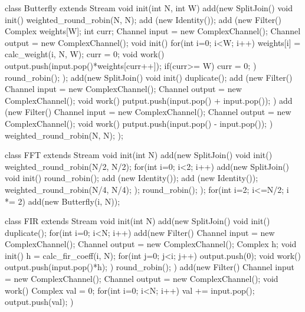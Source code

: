 

class Butterfly extends Stream {
   void init(int N, int W) {
      add(new SplitJoin() {
         void init() {
            weighted_round_robin(N, N);
            add (new Identity());
            add (new Filter() {
               Complex weights[W];
               int curr;
               Channel input = new ComplexChannel();
               Channel output = new ComplexChannel();
               void init() {
                  for(int i=0; i<W; i++)
                     weights[i] = calc_weight(i, N, W);
                  curr = 0;
               }
               void work() {
                  output.push(input.pop()*weights[curr++]);
                  if(curr>= W) curr = 0;
               }    
            })
            round_robin();
      }});
      add(new SplitJoin() {
         void init() {
            duplicate();
            add (new Filter() {   
               Channel input = new ComplexChannel();
               Channel output = new ComplexChannel();
               void work() {
                  putput.push(input.pop() + input.pop());
               }
            })
            add (new Filter() {   
               Channel input = new ComplexChannel();
               Channel output = new ComplexChannel();
               void work() {
                  putput.push(input.pop() - input.pop());
               }
            })
            weighted_round_robin(N, N);
      }});
   }
}

class FFT extends Stream {
   void init(int N) {
      add(new SplitJoin() {
         void init() {
            weighted_round_robin(N/2, N/2);
            for(int i=0; i<2; i++) 
               add(new SplitJoin() {
                  void init() {
                     round_robin();
                     add (new Identity());
                     add (new Identity());
                     weighted_round_robin(N/4, N/4);
               }});
            round_robin();
      }});
      for(int i=2; i<=N/2; i *= 2)
        add(new Butterfly(i, N));
   }
}

class FIR extends Stream {
   void init(int N) {
      add(new SplitJoin() {
         void init() {
            duplicate();
            for(int i=0; i<N; i++)
               add(new Filter() {
                  Channel input = new ComplexChannel();
                  Channel output = new ComplexChannel();           
		  Complex h;
                  void init() {
                     h = calc_fir_coeff(i, N);
                     for(int j=0; j<i; j++) 
                        output.push(0);
                  }
                  void work() {
                     output.push(input.pop()*h);
                  }
               })
            round_robin();
         }
      })
      add(new Filter() { 
         Channel input = new ComplexChannel();
         Channel output = new ComplexChannel();
         void work() {
	    Complex val = 0;
            for(int i=0; i<N; i++)
               val += input.pop();
            output.push(val);
         }
      })
   }
}

